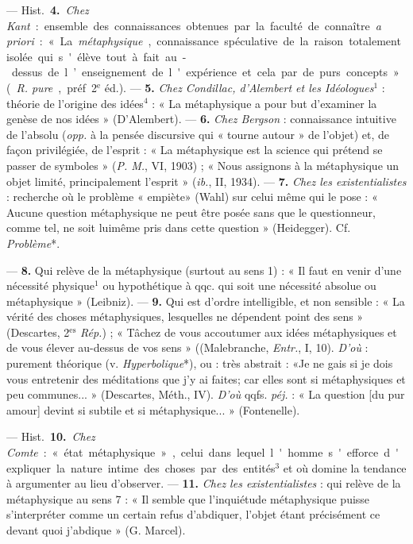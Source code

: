 \begin{itemize}[leftmargin=1cm, label=, itemsep=1pt]
— \si{Hist.} {\bf 4.} {\it Chez Kant} : ensemble des connaissances obtenues
par la faculté de connaître {\it a priori} : « La {\it métaphysique},
connaissance spéculative de la raison totalement isolée qui s'élève tout à
fait au-dessus de l’enseignement de l'expérience et cela par de purs
concepts... » ({\it R. pure}, préf. 2$^\text{e}$ éd.). — {\bf 5.} {\it Chez
Condillac, d’Alembert et les Idéologues}$^1$ : théorie de l’origine des
idées$^4$ : « La métaphysique a pour but d'examiner la genèse de nos
idées » (D’Alembert). — {\bf 6.} {\it Chez Bergson} : connaissance intuitive
de l'absolu ({\it opp.} à la pensée discursive qui « tourne autour » de
l’objet) et, de façon privilégiée, de l'esprit : « La métaphysique est la
science qui prétend se passer de symboles » ({\it P. M.}, VI, 1903) ; « Nous
assignons à la métaphysique un objet limité, principalement l'esprit »
({\it ib.}, II, 1934). — {\bf 7.} {\it Chez les existentialistes} : recherche
où le problème « empiète» (Wahl) sur celui même qui le pose : « Aucune
question métaphysique ne peut être posée sans que le questionneur, comme tel,
ne soit luimême pris dans cette question » (Heidegger). Cf. {\it Problème}*.

 — {\bf 8.} Qui relève de la métaphysique (surtout au
sens 1) : « Il faut en venir d’une nécessité physique$^1$ ou hypothétique à
qqc. qui soit une nécessité absolue ou métaphysique » (Leibniz). — {\bf 9.}
Qui est d’ordre intelligible, et non
sensible : « La vérité des choses métaphysiques, lesquelles ne dépendent
point des sens » (Descartes, 2$^\text{es}$ {\it Rép.}) ; « Tâchez de vous
accoutumer aux idées métaphysiques et de vous élever au-dessus de vos
sens » ((Malebranche, {\it Entr.}, I, 10). {\it D'où} : purement théorique
(v. {\it Hyperbolique}*), ou : très abstrait : «Je ne gais si je dois vous
entretenir des méditations que j'y ai faites; car elles sont si métaphysiques
et peu communes... » (Descartes, Méth., IV). {\it D'où} qqfs. {\it péj.} :
« La question [du pur amour] devint si subtile et si
métaphysique... » (Fontenelle).

— \si{Hist.} {\bf 10.} {\it Chez Comte} : « état métaphysique », celui dans
lequel l'homme s'efforce d'expliquer la nature intime des choses par des
entités$^3$ et où domine la tendance à argumenter au lieu d'observer. —
{\bf 11.} {\it Chez les existentialistes} : qui relève de la métaphysique au
sens 7 : « Il semble que l'inquiétude métaphysique puisse s’interpréter comme
un certain refus d’abdiquer, l’objet étant précisément ce devant quoi
j'abdique » (G. Marcel).


\end{itemize}
